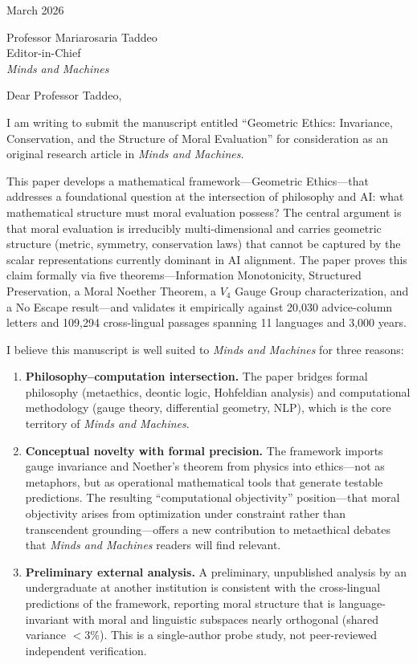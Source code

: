 \documentclass[12pt]{article}
\begin{document}
\noindent
March 2026

\bigskip

\noindent
Professor Mariarosaria Taddeo\\
Editor-in-Chief\\
\textit{Minds and Machines}

\bigskip

\noindent
Dear Professor Taddeo,

\bigskip

I am writing to submit the manuscript entitled ``Geometric Ethics: Invariance, Conservation, and the Structure of Moral Evaluation'' for consideration as an original research article in \textit{Minds and Machines}.

This paper develops a mathematical framework---Geometric Ethics---that addresses a foundational question at the intersection of philosophy and AI: what mathematical structure must moral evaluation possess? The central argument is that moral evaluation is irreducibly multi-dimensional and carries geometric structure (metric, symmetry, conservation laws) that cannot be captured by the scalar representations currently dominant in AI alignment. The paper proves this claim formally via five theorems---Information Monotonicity, Structured Preservation, a Moral Noether Theorem, a $V_4$ Gauge Group characterization, and a No Escape result---and validates it empirically against 20,030 advice-column letters and 109,294 cross-lingual passages spanning 11 languages and 3,000 years.

I believe this manuscript is well suited to \textit{Minds and Machines} for three reasons:

\begin{enumerate}
    \item \textbf{Philosophy--computation intersection.} The paper bridges formal philosophy (metaethics, deontic logic, Hohfeldian analysis) and computational methodology (gauge theory, differential geometry, NLP), which is the core territory of \textit{Minds and Machines}.

    \item \textbf{Conceptual novelty with formal precision.} The framework imports gauge invariance and Noether's theorem from physics into ethics---not as metaphors, but as operational mathematical tools that generate testable predictions. The resulting ``computational objectivity'' position---that moral objectivity arises from optimization under constraint rather than transcendent grounding---offers a new contribution to metaethical debates that \textit{Minds and Machines} readers will find relevant.

    \item \textbf{Preliminary external analysis.} A preliminary, unpublished analysis by an undergraduate at another institution is consistent with the cross-lingual predictions of the framework, reporting moral structure that is language-invariant with moral and linguistic subspaces nearly orthogonal (shared variance $< 3\%$). This is a single-author probe study, not peer-reviewed independent verification.
\end{enumerate}
\end{document}
